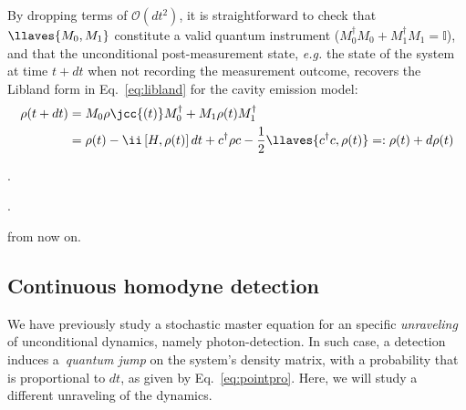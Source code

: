 By dropping terms of $\mathcal{O}(dt^2)$, it is straightforward to check that $\llaves{M_0, M_1}$ constitute a valid quantum instrument ($M_{0}^{\dagger} M_{0}+M_{1}^{\dagger} M_{1}=\mathbb{I}$), and that the unconditional post-measurement state, \textit{e.g.} the state of the system at time $t+dt$ when not recording the measurement outcome, recovers the Libland form in Eq.~\ref{eq:libland} for the cavity emission model:
\begin{align}\label{eq:cavityemission}
\rho(t+dt) &= M_0 \rho\jcc{(t)} M_0^\dagger + M_1 \rho(t) M_1^\dagger \\
&= \rho(t) - \ii \left[ H,\rho(t) \right] dt + c^\dagger \rho c - \frac{1}{2}\llaves{c^\dagger c, \rho(t)}=:\rho(t)+d\rho(t)
\end{align}

\jcc{
}.


\jcc{}.


   from now on.

\jcc{} 






\jcc{

}



\subsection{Continuous homodyne detection}\label{ssec:1_cmon_homodyne}
We have previously study a stochastic master equation for an specific \textit{unraveling} of unconditional dynamics, namely photon-detection. In such case, a detection induces a \textit{quantum jump} on the system's density matrix, with a probability that is proportional to $dt$, as given by Eq.~\ref{eq:pointpro}. Here, we will study a different unraveling of the dynamics.

